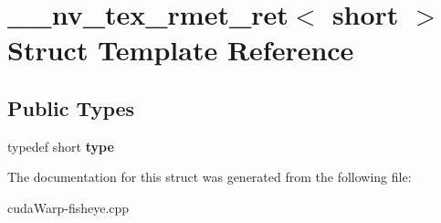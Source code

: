 \hypertarget{struct____nv__tex__rmet__ret_3_01short_01_4}{}\section{\+\_\+\+\_\+nv\+\_\+tex\+\_\+rmet\+\_\+ret$<$ short $>$ Struct Template Reference}
\label{struct____nv__tex__rmet__ret_3_01short_01_4}
\subsection*{Public Types}
\begin{DoxyCompactItemize}
\item 
typedef short {\bfseries type}\hypertarget{struct____nv__tex__rmet__ret_3_01short_01_4_a4c343d3e6f25b9f0124a6e9c1c693b12}{}\label{struct____nv__tex__rmet__ret_3_01short_01_4_a4c343d3e6f25b9f0124a6e9c1c693b12}

\end{DoxyCompactItemize}


The documentation for this struct was generated from the following file\+:\begin{DoxyCompactItemize}
\item 
cuda\+Warp-\/fisheye.\+cpp\end{DoxyCompactItemize}
